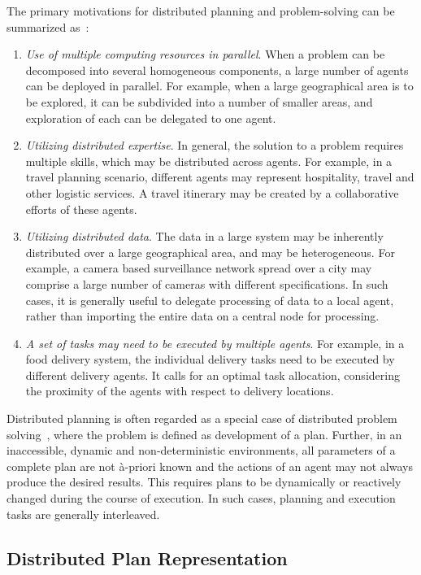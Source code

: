 \noindent
The primary motivations for distributed planning and problem-solving can be summarized as~\citep{Durfee:2013}:
\begin{enumerate}
	\item {\em Use of multiple computing resources in parallel}. When a problem can be decomposed into several homogeneous 
		components, a large number of agents can be deployed in parallel. For example, when a large geographical area 
		is to be explored, it can be subdivided into a number of smaller areas, and exploration of each can be delegated 
		to one agent.
	\item {\em Utilizing distributed expertise}. In general, the solution to a problem requires multiple skills, which may
		be distributed across agents. For example, in a travel planning scenario, different agents may represent hospitality,
		travel and other logistic services. A travel itinerary may be created by a collaborative efforts of these agents.
	\item {\em Utilizing distributed data}. The data in a large system may be inherently distributed over a large geographical
		area, and may be heterogeneous. For example, a camera based surveillance network spread over a city may comprise
		a large number of cameras with different specifications. In such cases, it is generally useful to delegate processing 
		of data to a local agent, rather than importing the entire data on a central node for processing.
	\item {\em A set of tasks may need to be executed by multiple agents}. For example, in a food delivery system, the individual
		delivery tasks need to be executed by different delivery agents. It calls for an optimal task allocation, considering 
		the proximity of the agents with respect to delivery locations.
\end{enumerate} 

Distributed planning is often regarded as a special case of distributed problem solving~\citep{Durfee:2013}, where the problem is 
defined as development of a plan. Further, in an inaccessible, dynamic and non-deterministic environments, all parameters of a 
complete plan are not \`{a}-priori known and the actions of an agent may not always produce the desired results. This requires plans 
to be dynamically or reactively changed during the course of execution. In such cases, planning and execution tasks are generally 
interleaved.

\subsection{Distributed Plan Representation}

